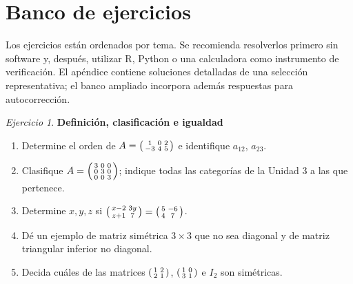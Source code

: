\documentclass[12pt]{article}
\theoremstyle{remark}
\newtheorem{Ejer}[definicion]{Ejercicio}
\begin{document}
\section{Banco de ejercicios}
Los ejercicios están ordenados por tema. Se recomienda resolverlos primero sin software y, después, utilizar R, Python o una calculadora como instrumento de verificación. El apéndice contiene soluciones detalladas de una selección representativa; el banco ampliado incorpora además respuestas para autocorrección.

\begin{Ejer} \textbf{Definición, clasificación e igualdad}
\begin{enumerate}
\item Determine el orden de $A=\begin{psmallmatrix}1&0&2\\-3&4&5\end{psmallmatrix}$ e identifique $a_{12}$, $a_{23}$.
\item Clasifique $A=\begin{psmallmatrix}3&0&0\\0&3&0\\0&0&3\end{psmallmatrix}$; indique todas las categorías de la Unidad 3 a las que pertenece.
\item Determine $x,y,z$ si $\begin{psmallmatrix}x-2&3y\\z+1&7\end{psmallmatrix}=\begin{psmallmatrix}5&-6\\4&7\end{psmallmatrix}$.
\item Dé un ejemplo de matriz simétrica $3\times3$ que no sea diagonal y de matriz triangular inferior no diagonal.
\item Decida cuáles de las matrices $\begin{psmallmatrix}1&2\\2&1\end{psmallmatrix}$, $\begin{psmallmatrix}1&0\\3&1\end{psmallmatrix}$ e $I_2$ son simétricas.
\end{enumerate}
\end{Ejer}
\end{document}
